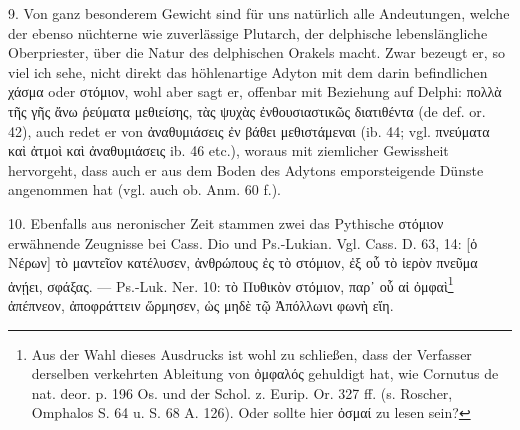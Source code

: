 \documentclass[a4paper, 11pt, oneside]{article}
\begin{document}
9. Von ganz besonderem Gewicht sind für uns natürlich alle Andeutungen, welche der ebenso nüchterne wie zuverlässige Plutarch, der delphische lebenslängliche Oberpriester, über die Natur des delphischen Orakels macht. Zwar bezeugt er, so viel ich sehe, nicht direkt das höhlenartige Adyton mit dem darin befindlichen χάσμα oder στόμιον, wohl aber sagt er, offenbar mit Beziehung auf Delphi: πολλὰ τῆς γῆς ἄνω ῥεύματα μεθιείσης, τὰς ψυχὰς ἐνθουσιαστικῶς διατιθέντα (de def. or. 42), auch redet er von ἀναθυμιάσεις ἐν βάθει μεθιστάμεναι (ib. 44; vgl. πνεύματα καὶ ἀτμοὶ καὶ ἀναθυμιάσεις ib. 46 etc.), woraus mit ziemlicher Gewissheit hervorgeht, dass auch er aus dem Boden des Adytons emporsteigende Dünste angenommen hat (vgl. auch ob. Anm. 60 f.).

10. Ebenfalls aus neronischer Zeit stammen zwei das Pythische στόμιον erwähnende Zeugnisse bei Cass. Dio und Ps.-Lukian. Vgl. Cass. D. 63, 14: [ὁ Νέρων] τὸ μαντεῖον κατέλυσεν, ἀνθρώπους ἐς τὸ στόμιον, ἐξ οὗ τὸ ἱερὸν πνεῦμα ἀνῄει, σφάξας. --- Ps.-Luk. Ner. 10: τὸ Πυθικὸν στόμιον, παρ᾽ οὗ αἱ ὀμφαὶ\footnote{Aus der Wahl dieses Ausdrucks ist wohl zu schließen, dass der Verfasser derselben verkehrten Ableitung von ὀμφαλός gehuldigt hat, wie Cornutus de nat. deor. p. 196 Os. und der Schol. z. Eurip. Or. 327 ff. (s. Roscher, Omphalos S. 64 u. S. 68 A. 126). Oder sollte hier ὀσμαί zu lesen sein?} ἀπέπνεον, ἀποφράττειν ὥρμησεν, ὡς μηδὲ τῷ Ἀπόλλωνι φωνὴ εἴη.
\end{document}
